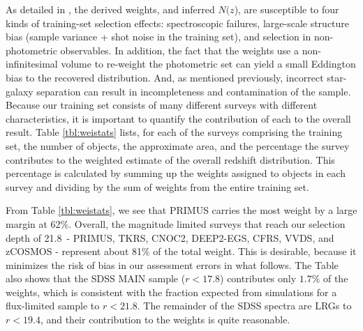 \documentclass[preprint]{aastex}
\newcommand{\rmax}{21.8}
\newcommand{\Nofz}{$N(z$)}
\begin{document}
As detailed in \cite{CunhaPhotoz09}, the derived weights, and inferred \Nofz,
are susceptible to four kinds of training-set selection effects: spectroscopic
failures, large-scale structure bias (sample variance + shot noise in the
training set), and selection in non-photometric observables.  In addition, the
fact that the weights use a non-infinitesimal volume to re-weight the
photometric set can yield a small Eddington bias to the recovered distribution.
And, as mentioned previously, incorrect star-galaxy separation can result in
incompleteness and contamination of the sample.  Because our training set
consists of many different surveys with different characteristics, it is
important to quantify the contribution of each to the overall result.  Table
\ref{tbl:weistats} lists, for each of the surveys comprising the training set,
the number of objects, the approximate area, and the percentage the survey
contributes to the weighted estimate of the overall redshift distribution.
This percentage is calculated by summing up the weights assigned to objects in
each survey and dividing by the sum of weights from the entire training set.


From Table \ref{tbl:weistats}, we see that PRIMUS carries the most weight by a
large margin at 62\%.  Overall, the magnitude limited surveys that reach our
selection depth of \rmax\ - PRIMUS, TKRS, CNOC2, DEEP2-EGS, CFRS, VVDS, and
zCOSMOS - represent about 81$\%$ of the total weight.  
This is desirable,
because it minimizes the risk of bias in our assessment errors in what follows.
The Table also shows that the SDSS MAIN sample ($r<17.8$) contributes only $1.7\%$ of the weights, which
is consistent with the fraction expected from simulations for a flux-limited sample 
to $r<21.8$.
The remainder of the SDSS spectra are LRGs to $r<19.4$, and their contribution to the weights is quite 
reasonable.
\end{document}
